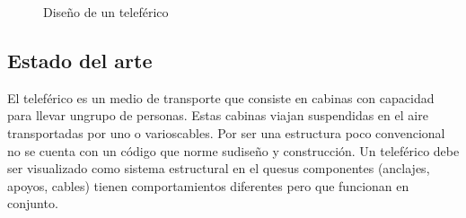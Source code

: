 \documentclass{article}
\begin{document}
\begin{figure}[!tbp]
  \centering
  \hfill
  \caption{Diseño de un teleférico}
\end{figure}
\subsection{Estado del arte}
El teleférico es un medio de transporte que consiste en cabinas con capacidad para llevar ungrupo de personas. Estas cabinas viajan suspendidas en el aire transportadas por uno o varioscables. Por ser una estructura poco convencional no se cuenta con un código que norme sudiseño y construcción. Un teleférico debe ser visualizado como sistema estructural en el quesus componentes (anclajes, apoyos, cables) tienen comportamientos diferentes pero que funcionan en conjunto.
\newpage
\end{document}
